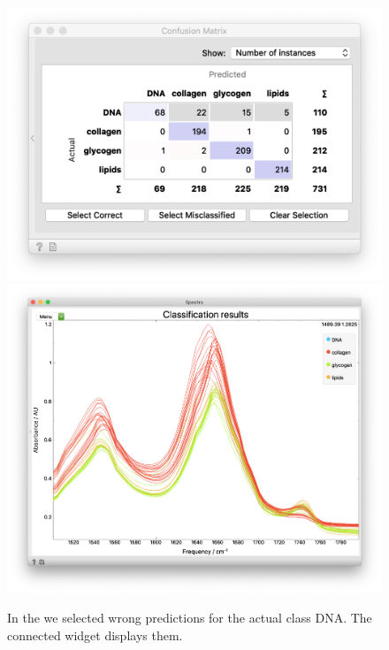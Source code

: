 \begin{figure}
  \newcommand{\spectra}{\includegraphics[scale=0.35]{sp_classification-fig2b.png}}
  \newcommand{\confusion}{\includegraphics[scale=0.45]{sp_classification-fig2a_.png}}
  \hspace{3.5cm} 
  {\confusion}
  {\spectra}
  \caption{In the  we selected wrong predictions for the actual class DNA. The connected  widget displays them.}
  \vspace{-0.5cm}
  \label{fig:spectra_classification-fig2}
\end{figure}

